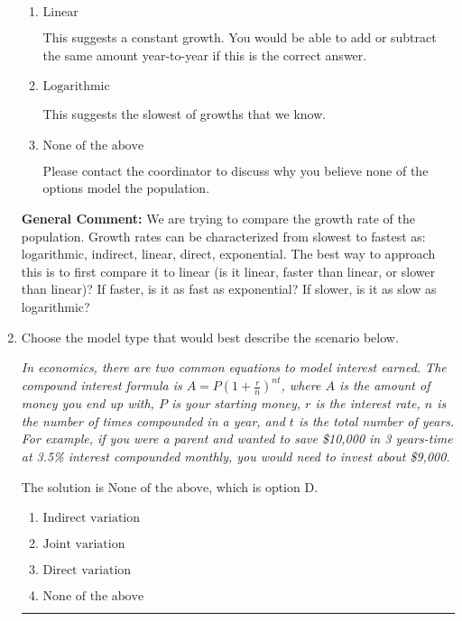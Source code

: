 \documentclass{extbook}[14pt]
\newcommand{\litem}[1]{\item #1

\rule{\textwidth}{0.4pt}}
\begin{document}
\begin{enumerate}
{\begin{enumerate}[label=\Alph*.]
This suggests the fastest of growths that we know.
\item \( \text{Linear} \)

This suggests a constant growth. You would be able to add or subtract the same amount year-to-year if this is the correct answer.
\item \( \text{Logarithmic} \)

This suggests the slowest of growths that we know.
\item \( \text{None of the above} \)

Please contact the coordinator to discuss why you believe none of the options model the population.
\end{enumerate}

\textbf{General Comment:} We are trying to compare the growth rate of the population. Growth rates can be characterized from slowest to fastest as: logarithmic, indirect, linear, direct, exponential. The best way to approach this is to first compare it to linear (is it linear, faster than linear, or slower than linear)? If faster, is it as fast as exponential? If slower, is it as slow as logarithmic?
}
\litem{
Choose the model type that would best describe the scenario below.

\begin{center}
    \textit{ In economics, there are two common equations to model interest earned. The compound interest formula is $A = P (1 + \frac{r}{n})^{nt}$, where $A$ is the amount of money you end up with, $P$ is your starting money, $r$ is the interest rate, $n$ is the number of times compounded in a year, and $t$ is the total number of years. For example, if you were a parent and wanted to save \$10,000 in 3 years-time at 3.5\% interest compounded monthly, you would need to invest about \$9,000. }
\end{center}
The solution is \( \text{None of the above} \), which is option D.\begin{enumerate}[label=\Alph*.]
\item \( \text{Indirect variation} \)


\item \( \text{Joint variation} \)


\item \( \text{Direct variation} \)


\item \( \text{None of the above} \)


\end{enumerate}

}
\end{enumerate}
\end{document}
